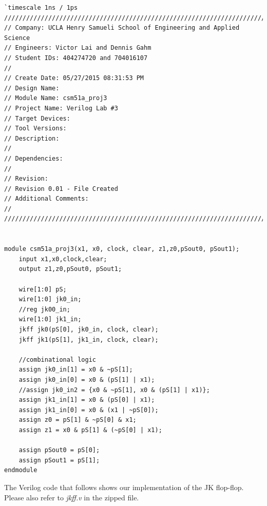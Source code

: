 \documentclass{article}
\begin{document}
\begin{verbatim}
`timescale 1ns / 1ps
/////////////////////////////////////////////////////////////////////////////
// Company: UCLA Henry Samueli School of Engineering and Applied Science
// Engineers: Victor Lai and Dennis Gahm
// Student IDs: 404274720 and 704016107
// 
// Create Date: 05/27/2015 08:31:53 PM
// Design Name: 
// Module Name: csm51a_proj3
// Project Name: Verilog Lab #3
// Target Devices: 
// Tool Versions: 
// Description: 
// 
// Dependencies: 
// 
// Revision:
// Revision 0.01 - File Created
// Additional Comments:
// 
/////////////////////////////////////////////////////////////////////////////


module csm51a_proj3(x1, x0, clock, clear, z1,z0,pSout0, pSout1);
    input x1,x0,clock,clear;
    output z1,z0,pSout0, pSout1;
      
    wire[1:0] pS;
    wire[1:0] jk0_in;
    //reg jk00_in;
    wire[1:0] jk1_in;
    jkff jk0(pS[0], jk0_in, clock, clear);
    jkff jk1(pS[1], jk1_in, clock, clear);
    
    //combinational logic
    assign jk0_in[1] = x0 & ~pS[1];
    assign jk0_in[0] = x0 & (pS[1] | x1);
    //assign jk0_in2 = {x0 & ~pS[1], x0 & (pS[1] | x1)};
    assign jk1_in[1] = x0 & (pS[0] | x1);
    assign jk1_in[0] = x0 & (x1 | ~pS[0]);
    assign z0 = pS[1] & ~pS[0] & x1;
    assign z1 = x0 & pS[1] & (~pS[0] | x1);
    
    assign pSout0 = pS[0];
    assign pSout1 = pS[1];    
endmodule
\end{verbatim}

The Verilog code that follows shows our implementation of the JK flop-flop. 
Please also refer to \textit{jkff.v} in the zipped file.\\
\end{document}
